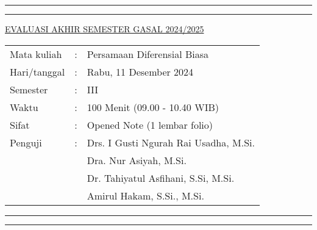 \documentclass[10pt,openany,a4paper]{article}
\begin{document}
\hrule
\hrule
\begin{table}[h!]
  \centering
  \underline{\MakeUppercase{Evaluasi Akhir Semester Gasal 2024/2025}}
  \begin{tabular}{l l l}
    Mata kuliah  & : & Persamaan Diferensial Biasa           \\
    Hari/tanggal & : & Rabu, 11 Desember 2024                \\
    Semester     & : & III                                   \\
    Waktu        & : & 100 Menit (09.00 - 10.40 WIB)         \\
    Sifat        & : & Opened Note (1 lembar folio)          \\
    Penguji      & : & Drs. I Gusti Ngurah Rai Usadha, M.Si. \\
                 &   & Dra. Nur Asiyah, M.Si.                \\
                 &   & Dr. Tahiyatul Asfihani, S.Si, M.Si.   \\
                 &   & Amirul Hakam, S.Si., M.Si.
  \end{tabular}
\end{table}
\hrule
\hrule
{}
\end{document}
